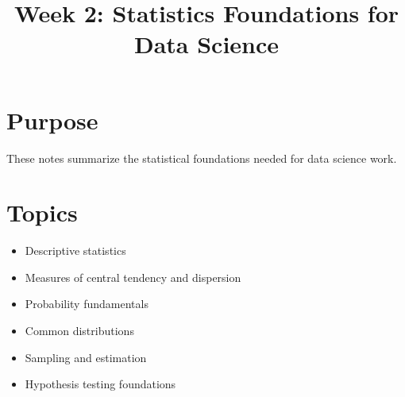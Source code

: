 \documentclass[11pt]{article}
\title{Week 2: Statistics Foundations for Data Science}
\author{}
\date{}
\begin{document}
\maketitle

\section{Purpose}

These notes summarize the statistical foundations needed for data science work.

\section{Topics}

\begin{itemize}
  \item Descriptive statistics
  \item Measures of central tendency and dispersion
  \item Probability fundamentals
  \item Common distributions
  \item Sampling and estimation
  \item Hypothesis testing foundations
\end{itemize}
\end{document}
